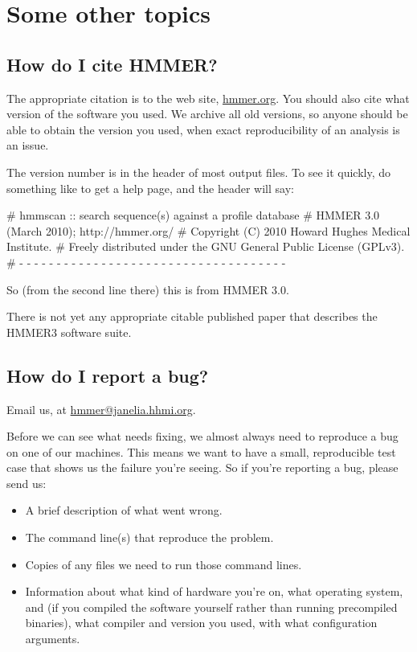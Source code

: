 
\section{Some other topics}
\label{section:more}
\setcounter{footnote}{0}

\subsection{How do I cite HMMER?}

The appropriate citation is to the web site, \url{hmmer.org}. You
should also cite what version of the software you used. We archive all
old versions, so anyone should be able to obtain the version you used,
when exact reproducibility of an analysis is an issue. 

The version number is in the header of most output files. To see it
quickly, do something like  to get a help page, and
the header will say:

\begin{sreoutput}
# hmmscan :: search sequence(s) against a profile database
# HMMER 3.0 (March 2010); http://hmmer.org/
# Copyright (C) 2010 Howard Hughes Medical Institute.
# Freely distributed under the GNU General Public License (GPLv3).
# - - - - - - - - - - - - - - - - - - - - - - - - - - - - - - - - - - - -
\end{sreoutput}

So (from the second line there) this is from HMMER 3.0.

There is not yet any appropriate citable published paper that
describes the HMMER3 software suite.



\subsection{How do I report a bug?}

Email us, at \url{hmmer@janelia.hhmi.org}.

Before we can see what needs fixing, we almost always need to
reproduce a bug on one of our machines. This means we want to have a
small, reproducible test case that shows us the failure you're seeing.
So if you're reporting a bug, please send us:

\begin{itemize}
 \item A brief description of what went wrong.
 \item The command line(s) that reproduce the problem.
 \item Copies of any files we need to run those command lines.
 \item Information about what kind of hardware you're on, what
   operating system, and (if you compiled the software yourself rather
   than running precompiled binaries), what compiler and version you
   used, with what configuration arguments.
\end{itemize}


